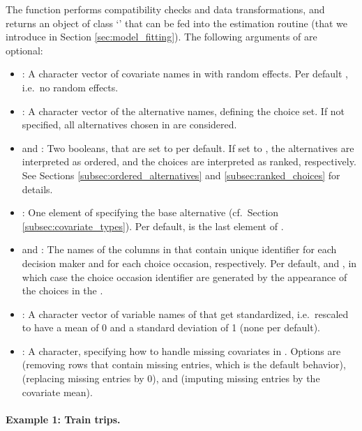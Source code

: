 \documentclass[article,shortnames]{jss}
\newcommand{\class}[1]{`\code{#1}'}
\newcommand{\fct}[1]{\code{#1()}}
\begin{document}
The function performs compatibility checks and data transformations, and returns an object of class \class{RprobitB\_data} that can be fed into the estimation routine \fct{fit\_model} (that we introduce in Section \ref{sec:model_fitting}). The following arguments of \fct{prepare\_data} are optional:
\begin{itemize}
  \item {}: A character vector of covariate names in  with random effects. Per default , i.e.\ no random effects.
  \item {}: A character vector of the alternative names, defining the choice set. If not specified, all alternatives chosen in  are considered.
  \item {} and : Two booleans, that are set to  per default. If set to , the alternatives are interpreted as ordered, and the choices are interpreted as ranked, respectively. See Sections \ref{subsec:ordered_alternatives} and \ref{subsec:ranked_choices} for details.
  \item {}: One element of  specifying the base alternative (cf.\ Section \ref{subsec:covariate_types}). Per default,  is the last element of .
  \item {} and : The names of the columns in  that contain unique identifier for each decision maker and for each choice occasion, respectively. Per default,  and , in which case the choice occasion identifier are generated by the appearance of the choices in the .
  \item {}: A character vector of variable names of  that get standardized, i.e.\ rescaled to have a mean of 0 and a standard deviation of 1 (none per default).
  \item {}: A character, specifying how to handle missing covariates in . Options are  (removing rows that contain missing entries, which is the default behavior),  (replacing missing entries by 0), and  (imputing missing entries by the covariate mean).
\end{itemize}

\paragraph{Example 1: Train trips.}
\end{document}
